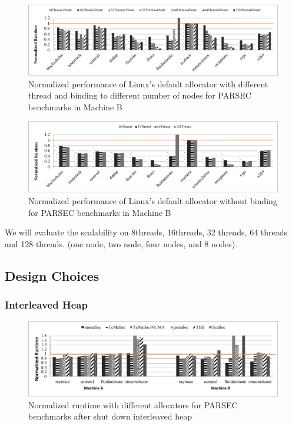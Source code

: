 \begin{figure}[!h]
    \centering
    \includegraphics[width=\textwidth]{figure/scalobility-binding-pthread.pdf}
    \caption{Normalized performance of Linux's default allocator with different thread and binding to different number of nodes for PARSEC benchmarks in Machine B}
    \label{binding-pthread-scalibity}
\end{figure}


\begin{figure}[!ht]
    \centering
    \includegraphics[width=\textwidth]{figure/scalobility-pthread.pdf}
    \caption{Normalized performance of Linux's default allocator without binding for PARSEC benchmarks in Machine B}
    \label{pthread-scalibity}
\end{figure}
We will evaluate the scalability on 8threads, 16threads, 32 threads, 64 threads and 128 threads. 
(one node, two node, four nodes, and 8 nodes). 

\subsection{Design Choices}
\label{sec:design}

\subsubsection{Interleaved Heap} 
\label{sec:interleavedheap}

\begin{figure}[H]
    \centering
    \includegraphics[width=\textwidth]{figure/no-interleaved.pdf}
    \caption{Normalized runtime with different allocators for PARSEC benchmarks after shut down interleaved heap}
    \label{parsec-no-interleaved-perf}
\end{figure}

